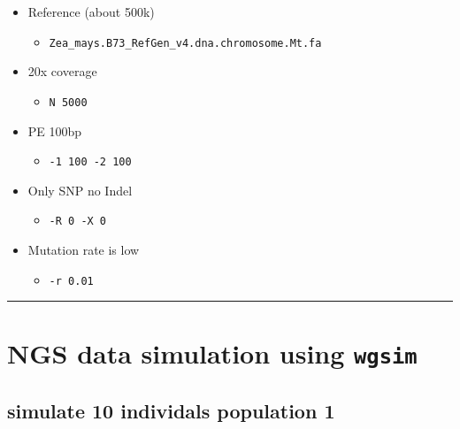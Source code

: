 \documentclass[]{article}
\providecommand{\tightlist}{%
  \setlength{\itemsep}{0pt}\setlength{\parskip}{0pt}}
\begin{document}
\begin{itemize}
\tightlist
\item
  Reference (about 500k)

  \begin{itemize}
  \tightlist
  \item
    \texttt{Zea\_mays.B73\_RefGen\_v4.dna.chromosome.Mt.fa}
  \end{itemize}
\item
  20x coverage

  \begin{itemize}
  \tightlist
  \item
    \texttt{N\ 5000}
  \end{itemize}
\item
  PE 100bp

  \begin{itemize}
  \tightlist
  \item
    \texttt{-1\ 100\ -2\ 100}
  \end{itemize}
\item
  Only SNP no Indel

  \begin{itemize}
  \tightlist
  \item
    \texttt{-R\ 0\ -X\ 0}
  \end{itemize}
\item
  Mutation rate is low

  \begin{itemize}
  \tightlist
  \item
    \texttt{-r\ 0.01}
  \end{itemize}
\end{itemize}

\begin{center}\rule{0.5\linewidth}{0.5pt}\end{center}

\hypertarget{ngs-data-simulation-using-wgsim-2}{%
\section{\texorpdfstring{NGS data simulation using
\texttt{wgsim}}{NGS data simulation using wgsim}}\label{ngs-data-simulation-using-wgsim-2}}

\hypertarget{simulate-10-individals-population-1}{%
\subsection{simulate 10 individals population
1}\label{simulate-10-individals-population-1}}
\end{document}
